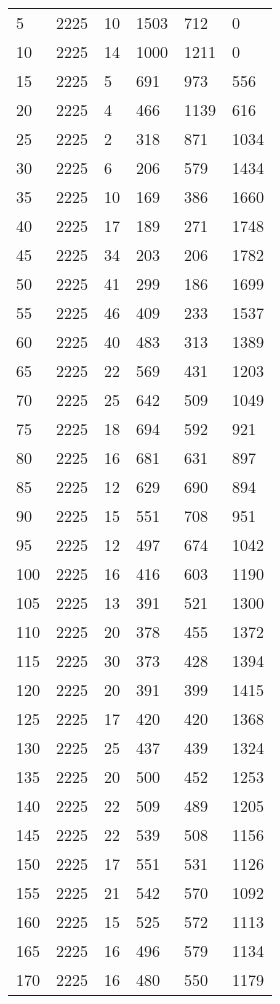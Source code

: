 \begin{longtable}{|l|l|l|l|l|l|}
5 & 2225 & 10 & 1503 & 712 & 0 \\
10 & 2225 & 14 & 1000 & 1211 & 0 \\
15 & 2225 & 5 & 691 & 973 & 556 \\
20 & 2225 & 4 & 466 & 1139 & 616 \\
25 & 2225 & 2 & 318 & 871 & 1034 \\
30 & 2225 & 6 & 206 & 579 & 1434 \\
35 & 2225 & 10 & 169 & 386 & 1660 \\
40 & 2225 & 17 & 189 & 271 & 1748 \\
45 & 2225 & 34 & 203 & 206 & 1782 \\
50 & 2225 & 41 & 299 & 186 & 1699 \\
55 & 2225 & 46 & 409 & 233 & 1537 \\
60 & 2225 & 40 & 483 & 313 & 1389 \\
65 & 2225 & 22 & 569 & 431 & 1203 \\
70 & 2225 & 25 & 642 & 509 & 1049 \\
75 & 2225 & 18 & 694 & 592 & 921 \\
80 & 2225 & 16 & 681 & 631 & 897 \\
85 & 2225 & 12 & 629 & 690 & 894 \\
90 & 2225 & 15 & 551 & 708 & 951 \\
95 & 2225 & 12 & 497 & 674 & 1042 \\
100 & 2225 & 16 & 416 & 603 & 1190 \\
105 & 2225 & 13 & 391 & 521 & 1300 \\
110 & 2225 & 20 & 378 & 455 & 1372 \\
115 & 2225 & 30 & 373 & 428 & 1394 \\
120 & 2225 & 20 & 391 & 399 & 1415 \\
125 & 2225 & 17 & 420 & 420 & 1368 \\
130 & 2225 & 25 & 437 & 439 & 1324 \\
135 & 2225 & 20 & 500 & 452 & 1253 \\
140 & 2225 & 22 & 509 & 489 & 1205 \\
145 & 2225 & 22 & 539 & 508 & 1156 \\
150 & 2225 & 17 & 551 & 531 & 1126 \\
155 & 2225 & 21 & 542 & 570 & 1092 \\
160 & 2225 & 15 & 525 & 572 & 1113 \\
165 & 2225 & 16 & 496 & 579 & 1134 \\
170 & 2225 & 16 & 480 & 550 & 1179 \\

\end{longtable}
